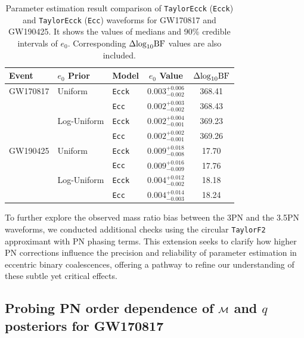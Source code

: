 \documentclass[aps,prd,twocolumn,superscriptaddress,groupedaddress,nofootinbib,showpacs,eqsecnum,useAms]{revtex4-2}
\begin{document}
\begingroup
\renewcommand{\arraystretch}{1.5} %
\begin{center}
\begin{table}[ht!]
\begin{tabular}{lllcc}
\hline\hline
Event     & $e_0$ Prior       & Model & $e_0$ Value& $\Delta{\rm log}_{10}{\rm BF}$  \\
\hline
GW170817  & Uniform     & \texttt{Ecck}  & $0.003^{+0.006}_{-0.002}$ & 368.41      \\
          &             & \texttt{Ecc}   & $0.002^{+0.003}_{-0.002}$ & 368.43              \\
          & Log-Uniform & \texttt{Ecck}  & $0.002^{+0.004}_{-0.001}$ & 369.23     \\
          &             & \texttt{Ecc}   & $0.002^{+0.002}_{-0.001}$ & 369.26              \\
\hline
GW190425  & Uniform     & \texttt{Ecck}  & $0.009^{+0.018}_{-0.008}$ & 17.70      \\
          &             & \texttt{Ecc}   & $0.009^{+0.016}_{-0.009}$ & 17.76              \\
          & Log-Uniform & \texttt{Ecck}  & $0.004^{+0.012}_{-0.002}$ & 18.18     \\
          &             & \texttt{Ecc}   & $0.004^{+0.014}_{-0.003}$ & 18.24              \\
\hline\hline
\end{tabular}
\caption{Parameter estimation result comparison of \texttt{TaylorEcck} (\texttt{Ecck}) and \texttt{TaylorEcck} (\texttt{Ecc}) waveforms for GW170817 and GW190425. It shows the values of medians and 90\% credible intervals of $e_0$. Corresponding $\Delta{\rm log}_{10}{\rm BF}$ values are also included.}
\label{tab:waveform_comparison}
\end{table}
\end{center}
\endgroup
To further explore the observed mass ratio bias between the 3PN and the 3.5PN waveforms, we conducted additional checks using the circular \texttt{TaylorF2} approximant with PN phasing terms. This extension seeks to clarify how higher PN corrections influence the precision and reliability of parameter estimation in eccentric binary coalescences, offering a pathway to refine our understanding of these subtle yet critical effects.

\subsection{Probing PN order  dependence of ${\cal M}$  and $q$ posteriors for GW170817}\label{sec:tf2_analysis}
\end{document}
